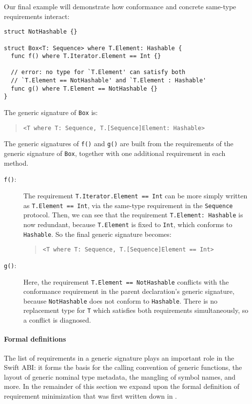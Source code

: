 \documentclass[../generics]{subfiles}
\begin{document}
\begin{example}\label{conformance minimization}
Our final example will demonstrate how conformance and concrete same-type requirements interact:
\begin{Verbatim}
struct NotHashable {}

struct Box<T: Sequence> where T.Element: Hashable {
  func f() where T.Iterator.Element == Int {}
  
  // error: no type for `T.Element' can satisfy both
  // `T.Element == NotHashable' and `T.Element : Hashable'
  func g() where T.Element == NotHashable {}
}
\end{Verbatim}
The generic signature of \texttt{Box} is:
\begin{quote}
\begin{verbatim}
<T where T: Sequence, T.[Sequence]Element: Hashable>
\end{verbatim}
\end{quote}
The generic signatures of \texttt{f()} and \texttt{g()} are built from the requirements of the generic signature of \texttt{Box}, together with one additional requirement in each method.
\begin{description}
\item[\texttt{f()}:] The requirement \verb|T.Iterator.Element == Int| can be more simply written as \verb|T.Element == Int|, via the same-type requirement in the \texttt{Sequence} protocol. Then, we can see that the requirement \verb|T.Element: Hashable| is now redundant, because \verb|T.Element| is fixed to \verb|Int|, which conforms to \verb|Hashable|. So the final generic signature becomes:
\begin{quote}
\begin{verbatim}
<T where T: Sequence, T.[Sequence]Element == Int>
\end{verbatim}
\end{quote}

\item[\texttt{g()}:] Here, the requirement \verb|T.Element == NotHashable| conflicts with the conformance requirement in the parent declaration's generic signature, because \verb|NotHashable| does not conform to \verb|Hashable|. There is no replacement type for \texttt{T} which satisfies both requirements simultaneously, so a conflict is diagnosed.
\end{description}
\end{example}

\paragraph{Formal definitions}
The list of requirements in a generic signature plays an important role in the Swift ABI: it forms the basis for the calling convention of generic functions, the layout of generic nominal type metadata, the mangling of symbol names, and more. In the remainder of this section we expand upon the formal definition of requirement minimization that was first written down in \cite{gensig}.
\end{document}
